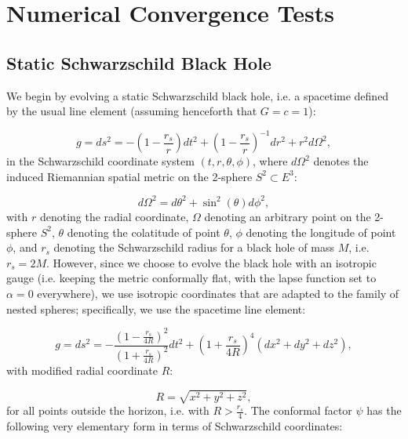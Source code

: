 \documentclass{article}
\begin{document}
\section{Numerical Convergence Tests}
\label{sec:Section4}

\subsection{Static Schwarzschild Black Hole}

We begin by evolving a static Schwarzschild black hole, i.e. a spacetime defined by the usual line element (assuming henceforth that ${G = c = 1}$)\cite{misner2}:

\begin{equation}
g = ds^2 = - \left( 1 - \frac{r_s}{r} \right) dt^2 + \left( 1 - \frac{r_s}{r} \right)^{-1} dr^2 + r^2 d \Omega^2,
\end{equation}
in the Schwarzschild coordinate system ${\left( t, r, \theta, \phi \right)}$, where ${d \Omega^2}$ denotes the induced Riemannian spatial metric on the 2-sphere ${S^2 \subset E^3}$:

\begin{equation}
d \Omega^2 = d \theta^2 + \sin^2 \left( \theta \right) d \phi^2,
\end{equation}
with $r$ denoting the radial coordinate, ${\Omega}$ denoting an arbitrary point on the 2-sphere ${S^2}$, ${\theta}$ denoting the colatitude of point ${\theta}$, ${\phi}$ denoting the longitude of point ${\phi}$, and ${r_s}$ denoting the Schwarzschild radius for a black hole of mass $M$, i.e. ${r_s = 2M}$. However, since we choose to evolve the black hole with an isotropic gauge (i.e. keeping the metric conformally flat, with the lapse function set to ${\alpha = 0}$ everywhere), we use isotropic coordinates that are adapted to the family of nested spheres; specifically, we use the spacetime line element:

\begin{equation}
g = ds^2 = - \frac{\left( 1 - \frac{r_s}{4R} \right)^2}{\left( 1 + \frac{r_s}{4R} \right)^2} dt^2 + \left( 1 + \frac{r_s}{4R} \right)^4 \left( dx^2 + dy^2 + dz^2 \right),
\end{equation}
with modified radial coordinate $R$:

\begin{equation}
R = \sqrt{x^2 + y^2 + z^2},
\end{equation}
for all points outside the horizon, i.e. with ${R > \frac{r_s}{4}}$. The conformal factor ${\psi}$ has the following very elementary form in terms of Schwarzschild coordinates:
\end{document}
